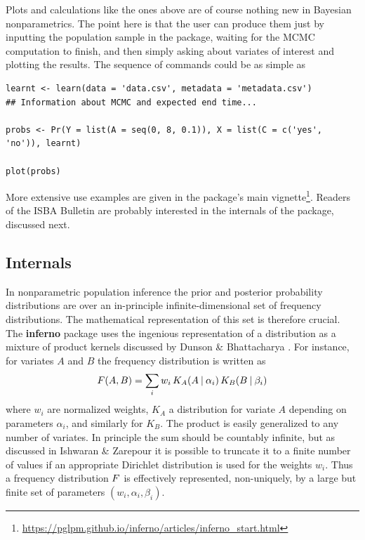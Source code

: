 Plots and calculations like the ones above are of course nothing new in Bayesian nonparametrics. The point here is that the user can produce them just by inputting the population sample in the package, waiting for the MCMC computation to finish, and then simply asking about variates of interest and plotting the results. The sequence of commands could be as simple as
\begin{verbatim}
learnt <- learn(data = 'data.csv', metadata = 'metadata.csv')
## Information about MCMC and expected end time...

probs <- Pr(Y = list(A = seq(0, 8, 0.1)), X = list(C = c('yes', 'no')), learnt)

plot(probs)
\end{verbatim}
More extensive use examples are given in the package's main vignette\footnote{\url{https://pglpm.github.io/inferno/articles/inferno_start.html}}. Readers of the ISBA Bulletin are probably interested in the internals of the package, discussed next.


\subsection*{Internals}
\label{sec:representation}

In nonparametric population inference the prior and posterior probability distributions are over an in-principle infinite-dimensional set of frequency distributions. The mathematical representation of this set is therefore crucial. The \textbf{inferno} package uses the ingenious representation of a distribution as a mixture of product kernels discussed by Dunson \& Bhattacharya \citeyear{dunsonetal2011}. For instance, for variates $A$ and $B$ the frequency distribution is written as
\begin{equation}
  \label{eq:mixture_kernel}
  \yF(A, B) = \sum_{i} w_{i}\, K_{A}(A \| \alpha_{i})\, K_{B}(B \| \beta_{i})
\end{equation}
where $w_{i}$ are normalized weights, $K_{A}$ a distribution for variate $A$ depending on parameters $\alpha_{i}$, and similarly for $K_{B}$. The product is easily generalized to any number of variates. In principle the sum should be countably infinite, but as discussed in Ishwaran \& Zarepour \citeyear{ishwaranetal2002b,ishwaranetal2002c} it is possible to truncate it to a finite number of values if an appropriate Dirichlet distribution is used for the weights $w_{i}$. Thus a frequency distribution $F$ is effectively represented, non-uniquely, by a large but finite set of parameters $(w_{i}, \alpha_{i}, \beta_{i})$.

